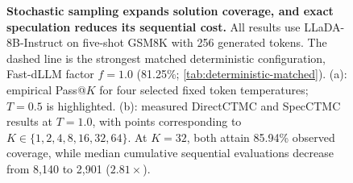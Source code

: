 \begin{figure}[t]
\caption{
{\bf Stochastic sampling expands solution coverage, and exact speculation reduces its sequential cost.}
All results use LLaDA-8B-Instruct on five-shot GSM8K with 256 generated tokens. The dashed line is the strongest matched deterministic configuration, Fast-dLLM factor \(f=1.0\) (81.25\%; \cref{tab:deterministic-matched}). (a): empirical Pass@\(K\) for four selected fixed token temperatures; \(T=0.5\) is highlighted. (b): measured DirectCTMC and SpecCTMC results at \(T=1.0\), with points corresponding to \(K\in\{1,2,4,8,16,32,64\}\). At \(K=32\), both attain 85.94\% observed coverage, while median cumulative sequential evaluations decrease from 8,140 to 2,901 (\(2.81\times\)).
}
\label{fig:stochastic-coverage}
\end{figure}
